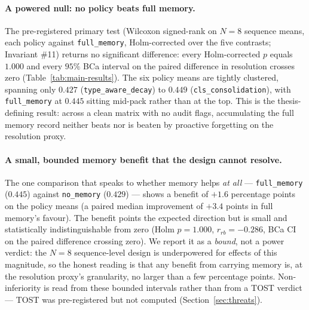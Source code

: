 \paragraph{A powered null: no policy beats full memory.}
The pre-registered primary test (Wilcoxon signed-rank on $N=8$ sequence means, each
policy against \texttt{full\_memory}, Holm-corrected over the five contrasts; Invariant
\#11) returns no significant difference: every Holm-corrected $p$ equals $1.000$ and every
$95\%$ BCa interval on the paired difference in resolution crosses zero
(Table~\ref{tab:main-results}). The six policy means are tightly clustered, spanning only
$0.427$ (\texttt{type\_aware\_decay}) to $0.449$ (\texttt{cls\_consolidation}), with
\texttt{full\_memory} at $0.445$ sitting mid-pack rather than at the top. This is the
thesis-defining result: across a clean matrix with no audit flags, accumulating the full
memory record neither beats nor is beaten by proactive forgetting on the resolution proxy.

\paragraph{A small, bounded memory benefit that the design cannot resolve.}
The one comparison that speaks to whether memory helps \emph{at all} ---
\texttt{full\_memory} ($0.445$) against \texttt{no\_memory} ($0.429$) --- shows a benefit
of $+1.6$ percentage points on the policy means (a paired median improvement of $+3.4$
points in full memory's favour). The benefit points the expected direction but is small
and statistically indistinguishable from zero (Holm $p = 1.000$, $r_{rb} = -0.286$, BCa
CI on the paired difference crossing zero). We report it as a \emph{bound}, not a power
verdict: the $N=8$ sequence-level design is underpowered for effects of this magnitude, so
the honest reading is that any benefit from carrying memory is, at the resolution proxy's
granularity, no larger than a few percentage points. Non-inferiority is read from these
bounded intervals rather than from a TOST verdict --- TOST was pre-registered but not
computed (Section~\ref{sec:threats}).

